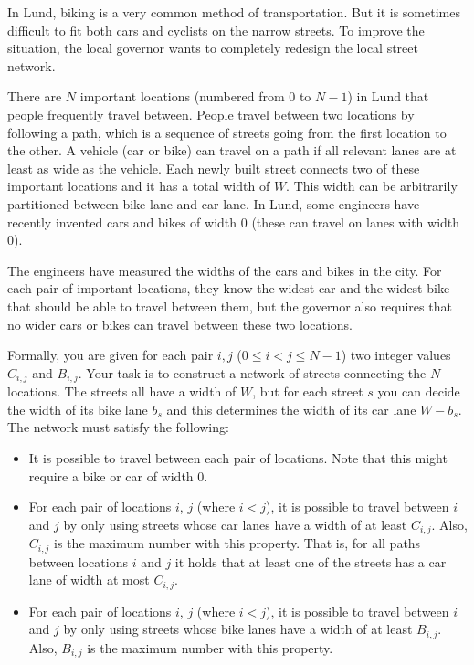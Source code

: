 In Lund, biking is a very common method of transportation. But it is sometimes difficult to 
fit both cars and cyclists on the narrow streets.
To improve the situation, the local governor wants to completely redesign the local street network. 

There are $N$ important locations (numbered from $0$ to $N-1$) in Lund that people frequently travel between.
People travel between two locations by following a path, which is a sequence of streets going from the first location to the other.
A vehicle (car or bike) can travel on a path if all relevant lanes are at least as wide as the vehicle.
Each newly built street connects two of these important locations and it has a total width of $W$.
This width can be arbitrarily partitioned between bike lane and car lane.
In Lund, some engineers have recently invented cars and bikes of width $0$ (these can travel on lanes with width $0$).

The engineers have measured the widths of the cars and bikes in the city. 
For each pair of important locations, they know the widest car and the widest bike that should be able to travel between them, 
but the governor also requires that no wider cars or bikes can travel between these two locations.

Formally, you are given for each pair $i,j$ ($0 \le i<j \le N-1$) two integer values
$C_{i,j}$ and $B_{i,j}$. Your task is to construct a network of streets connecting the $N$ locations.
The streets all have a width of $W$, but for each street $s$ you can decide the
width of its bike lane $b_s$ and this determines the width of its car lane $W-b_s$.
The network must satisfy the following:

\begin{itemize}
  \item It is possible to travel between each pair of locations. Note that this might require a bike or car of width $0$.

  \item For each pair of locations $i$, $j$ (where $i < j$), it is possible to travel between 
  $i$ and $j$ by only using streets whose car lanes have a width of at least $C_{i,j}$. Also, $C_{i,j}$ is the 
  maximum number with this property. That is, for all paths between locations
    $i$ and $j$ it holds that at least one of the streets has a car lane of
    width at most $C_{i,j}$.

  \item For each pair of locations $i$, $j$ (where $i < j$), it is possible to travel between 
  $i$ and $j$ by only using streets whose bike lanes have a width of at least $B_{i,j}$. Also, $B_{i,j}$ is the 
  maximum number with this property.

\end{itemize}

